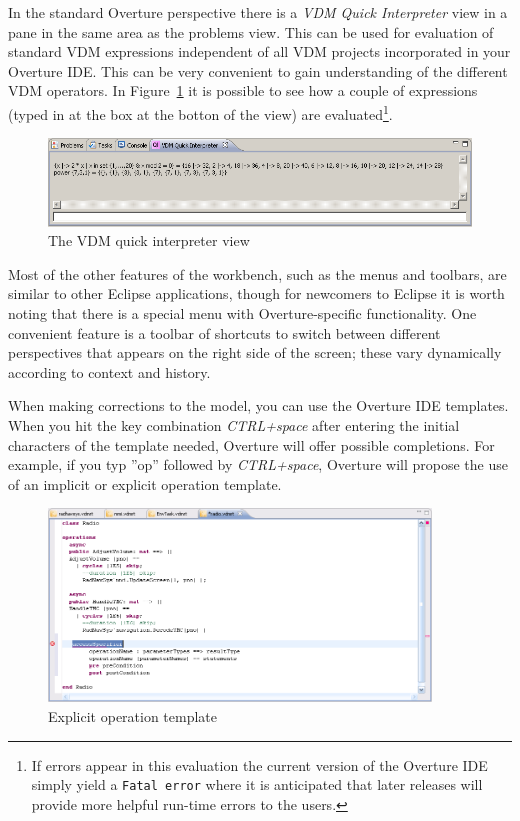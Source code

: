 In the standard Overture perspective there is a \emph{VDM Quick
  Interpreter} view in a pane in the same area as the problems
view. This can be used for evaluation of standard VDM expressions
independent of all VDM projects incorporated in your Overture
IDE. This can be very convenient to gain understanding of the
different VDM operators. In Figure~\ref{fig:QuickIntView} it is
possible to see how a couple of expressions (typed in at the box at
the botton of the view) are evaluated\footnote{If errors appear in
  this evaluation the current version of the Overture IDE simply yield
  a \texttt{Fatal error} where it is anticipated that later releases
  will provide more helpful run-time errors to the users.}. 

\begin{figure}[!htb]
\begin{center}
  \includegraphics[width=4.5in]{figures/quickinterpreter}
  \caption[labelInTOC]{The VDM quick interpreter view}
  \label{fig:QuickIntView}
\end{center}
\end{figure}

Most of the other features of the workbench, such as the menus and
toolbars, are similar to other Eclipse applications, though for
newcomers to Eclipse it is worth noting that there is a special menu
with Overture-specific functionality. One convenient feature is a
toolbar of shortcuts to switch between different perspectives that
appears on the right side of the screen; these vary dynamically
according to context and history.

When making corrections to the model, you can use the Overture IDE
templates. When you hit the key combination \textit{CTRL+space} after
entering the initial characters of the template needed, Overture will
offer possible completions. For example, if you typ ''op'' followed by
\textit{CTRL+space}, Overture will propose the use of an implicit or
explicit operation template.

\begin{figure}
	\begin{center}
	\includegraphics[width=4in]{figures/OperationTemplateRT}
	\caption{Explicit operation template}
	\label{fig:userguide:operationTemplate}
	\end{center}
\end{figure}

